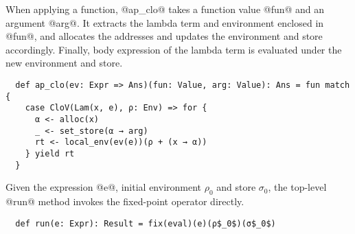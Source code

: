 When applying a function, @ap_clo@ takes a function value @fun@ and an argument
@arg@. It extracts the lambda term and environment enclosed in @fun@, and
allocates the addresses and updates the environment and store accordingly.
Finally, body expression of the lambda term is evaluated under the new
environment and store.
\begin{lstlisting}
  def ap_clo(ev: Expr => Ans)(fun: Value, arg: Value): Ans = fun match {
    case CloV(Lam(x, e), ρ: Env) => for {
      α <- alloc(x)
      _ <- set_store(α → arg)
      rt <- local_env(ev(e))(ρ + (x → α))
    } yield rt
  }
\end{lstlisting}

Given the expression @e@, initial environment $\rho_0$ and store $\sigma_0$,
the top-level @run@ method invokes the fixed-point operator directly.
\begin{lstlisting}
  def run(e: Expr): Result = fix(eval)(e)(ρ$_0$)(σ$_0$)
\end{lstlisting}
